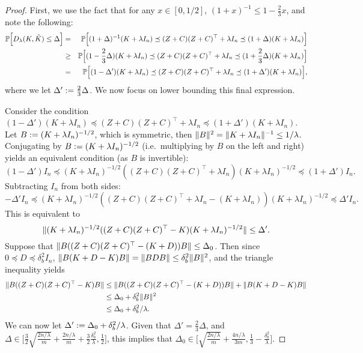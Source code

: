 \begin{proof}
First, we use the fact that for any $x\in[0,1/2]$, $(1+x)^{-1} \leq 1-\frac{2}{3}x$, and note the following:
\begin{eqnarray*}
\mathbb{P}\Big[D_{\lambda}(K,\tilde{K}) \leq \Delta\Big] &=& \mathbb{P}\Big[(1 + \Delta)^{-1}(K + \lambda I_n) \preceq (Z + C) (Z + C)^\top + \lambda I_n \preceq (1 + \Delta)(K + \lambda I_n)\Big] \\
&\geq& \mathbb{P}\Big[(1 - \frac{2}{3}\Delta)(K + \lambda I_n) \preceq (Z + C) (Z + C)^\top + \lambda I_n \preceq (1 + \frac{2}{3}\Delta)(K + \lambda I_n)\Big]\\
&=& \mathbb{P}\Big[(1 - \Delta')(K + \lambda I_n) \preceq (Z + C) (Z + C)^\top + \lambda I_n \preceq (1 + \Delta')(K + \lambda I_n)\Big],
\end{eqnarray*}
where we let $\Delta' := \frac{2}{3}\Delta$.  We now focus on lower bounding this final expression.

Consider the condition $(1 - \Delta')(K + \lambda I_n) \preceq (Z + C) (Z + C)^\top + \lambda I_n \preceq (1 +
\Delta')(K + \lambda I_n)$.
Let $B := (K + \lambda I_n)^{-1/2}$, which is symmetric, then $\|B\|^2 =
\|K + \lambda I_n\|^{-1} \leq 1/\lambda$.
Conjugating by $B := (K + \lambda I_n)^{-1/2}$ (i.e.\ multiplying by $B$ on the
left and right) yields an equivalent condition (as $B$ is
invertible):
\begin{equation*}
(1 - \Delta') I_n \preceq (K + \lambda I_n)^{-1/2} ((Z + C) (Z + C)^\top + \lambda I_n) (K + \lambda I_n)^{-1/2} \preceq (1 + \Delta') I_n.
\end{equation*}
Subtracting $I_n$ from both sides:
\begin{equation*}
-\Delta' I_n \preceq (K + \lambda I_n)^{-1/2} ((Z + C) (Z + C)^\top + \lambda I_n - (K + \lambda I_n)) (K + \lambda I_n)^{-1/2} \preceq \Delta' I_n.
\end{equation*}
This is equivalent to
\begin{equation*}
\|(K + \lambda I_n)^{-1/2} ((Z + C) (Z + C)^\top - K) (K + \lambda I_n)^{-1/2}\| \leq \Delta'.
\end{equation*}
Suppose that $\|B((Z + C)(Z + C)^\top - (K + D))B\| \leq \Delta_0$.
Then since $0 \preceq D \preceq \delta^2_b I_n$, $\|B(K + D - K) B\| = \|B D B\| \leq \delta^2_b
\|B\|^2$, and the triangle inequality yields
\begin{align*}
\|B((Z + C)(Z + C)^\top - K)B\|
&\leq \|B((Z + C)(Z + C)^\top - (K + D))B\| + \|B (K + D - K)B\| \\
&\leq \Delta_0 + \delta^2_b \|B\|^2 \\
&\leq \Delta_0 + \delta^2_b/\lambda.
\end{align*}
We can now let $\Delta' := \Delta_0 + \delta^2_b/\lambda$.  Given that $\Delta' = \frac{2}{3}\Delta$, and $\Delta \in \Big[\frac{3}{2}\sqrt{\frac{2n/\lambda}{m}} + \frac{2n/\lambda}{m} + \frac{3}{2}\frac{\delta^2_b}{\lambda}, \frac{1}{2} \Big]$, this implies that $\Delta_0 \in \Big[\sqrt{\frac{2n/\lambda}{m}} + \frac{4n/\lambda}{3m}, \frac{1}{3}-\frac{\delta^2_b}{\lambda}\Big]$.


\end{proof}
